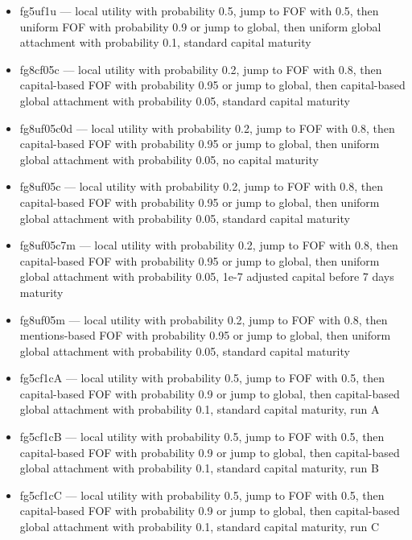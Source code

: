 \documentclass[10pt,oneside]{memoir}
\begin{document}
\begin{itemize}
\item fg5uf1u --- local utility with probability 0.5, jump to FOF with 0.5, then uniform FOF with probability 0.9 or jump to global, then uniform global attachment with probability 0.1, standard capital maturity

\item fg8cf05c --- local utility with probability 0.2, jump to FOF with 0.8, then capital-based FOF with probability 0.95 or jump to global, then capital-based global attachment with probability 0.05, standard capital maturity

\item fg8uf05c0d --- local utility with probability 0.2, jump to FOF with 0.8, then capital-based FOF with probability 0.95 or jump to global, then uniform global attachment with probability 0.05, no capital maturity

\item fg8uf05c --- local utility with probability 0.2, jump to FOF with 0.8, then capital-based FOF with probability 0.95 or jump to global, then uniform global attachment with probability 0.05, standard capital maturity

\item fg8uf05c7m --- local utility with probability 0.2, jump to FOF with 0.8, then capital-based FOF with probability 0.95 or jump to global, then uniform global attachment with probability 0.05, 1e-7 adjusted capital before 7 days maturity

\item fg8uf05m --- local utility with probability 0.2, jump to FOF with 0.8, then mentions-based FOF with probability 0.95 or jump to global, then uniform global attachment with probability 0.05, standard capital maturity

\item fg5cf1cA --- local utility with probability 0.5, jump to FOF with 0.5, then capital-based FOF with probability 0.9 or jump to global, then capital-based global attachment with probability 0.1, standard capital maturity, run A

\item fg5cf1cB --- local utility with probability 0.5, jump to FOF with 0.5, then capital-based FOF with probability 0.9 or jump to global, then capital-based global attachment with probability 0.1, standard capital maturity, run B

\item fg5cf1cC --- local utility with probability 0.5, jump to FOF with 0.5, then capital-based FOF with probability 0.9 or jump to global, then capital-based global attachment with probability 0.1, standard capital maturity, run C
\end{itemize}
\end{document}
